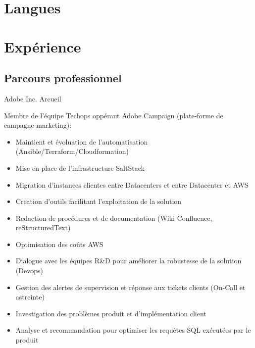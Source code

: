 \documentclass[10pt,a4paper,sans]{moderncv}        %
\begin{document}
\section{Langues}


\section{Expérience}
\subsection{Parcours professionnel}


              {Adobe Inc.}
              {Arcueil}
              {}
	      {Membre de l'équipe Techops oppérant Adobe Campaign (plate-forme de campagne marketing):
                \begin{itemize}
                \item Maintient et évoluation de l'automatisation (Ansible/Terraform/Cloudformation)
                \item Mise en place de l'infrastructure SaltStack
                \item Migration d'instances clientes entre Datacenters et entre Datacenter et AWS
                \item Creation d'outils facilitant l'exploitation de la solution
                \item Redaction de procédures et de documentation (Wiki Confluence, reStructuredText)
                \item Optimisation des coûts AWS
                \item Dialogue avec les équipes R&D pour améliorer la robustesse de la solution (Devops)
                \item Gestion des alertes de supervision et réponse aux tickets clients (On-Call et astreinte)
                \item Investigation des problèmes produit et d'implémentation client
                \item Analyse et recommandation pour optimiser les requètes SQL exécutées par le produit
                \end{itemize}
              }
\end{document}
